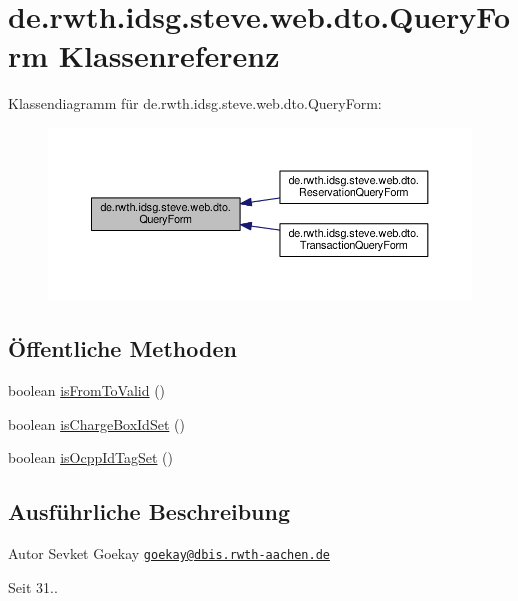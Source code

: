 \hypertarget{classde_1_1rwth_1_1idsg_1_1steve_1_1web_1_1dto_1_1_query_form}{\section{de.\-rwth.\-idsg.\-steve.\-web.\-dto.\-Query\-Form Klassenreferenz}
\label{classde_1_1rwth_1_1idsg_1_1steve_1_1web_1_1dto_1_1_query_form}
}


Klassendiagramm für de.\-rwth.\-idsg.\-steve.\-web.\-dto.\-Query\-Form\-:\nopagebreak
\begin{figure}[H]
\begin{center}
\leavevmode
\includegraphics[width=350pt]{classde_1_1rwth_1_1idsg_1_1steve_1_1web_1_1dto_1_1_query_form__inherit__graph}
\end{center}
\end{figure}
\subsection*{Öffentliche Methoden}
\begin{DoxyCompactItemize}
\item 
boolean \hyperlink{classde_1_1rwth_1_1idsg_1_1steve_1_1web_1_1dto_1_1_query_form_ad26a21f3b1d31044d8868ae733be3f20}{is\-From\-To\-Valid} ()
\item 
boolean \hyperlink{classde_1_1rwth_1_1idsg_1_1steve_1_1web_1_1dto_1_1_query_form_aa931140a109d6b35fae403b6d201520d}{is\-Charge\-Box\-Id\-Set} ()
\item 
boolean \hyperlink{classde_1_1rwth_1_1idsg_1_1steve_1_1web_1_1dto_1_1_query_form_a7844f428e4c7237893d6a6968d3cb819}{is\-Ocpp\-Id\-Tag\-Set} ()
\end{DoxyCompactItemize}


\subsection{Ausführliche Beschreibung}
\begin{DoxyAuthor}{Autor}
Sevket Goekay \href{mailto:goekay@dbis.rwth-aachen.de}{\tt goekay@dbis.\-rwth-\/aachen.\-de} 
\end{DoxyAuthor}
\begin{DoxySince}{Seit}
31.. 
\end{DoxySince}


